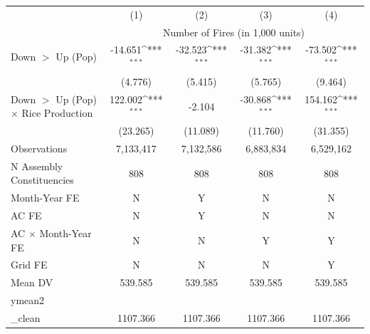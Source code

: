 {
\def\sym#1{\ifmmode^{#1}\else\(^{#1}\)\fi}
\begin{tabular}{l*{4}{c}}
\hline
            &\multicolumn{1}{c}{(1)}         &\multicolumn{1}{c}{(2)}         &\multicolumn{1}{c}{(3)}         &\multicolumn{1}{c}{(4)}         \\
            & \multicolumn{4}{c}{Number of Fires (in 1,000 units)} \\ \hline

Down $>$ Up (Pop)&     -14.651\sym{***}&     -32.523\sym{***}&     -31.382\sym{***}&     -73.502\sym{***}\\
            &     (4.776)         &     (5.415)         &     (5.765)         &     (9.464)         \\
Down $>$ Up (Pop) $\times$ Rice Production&     122.002\sym{***}&      -2.104         &     -30.868\sym{***}&     154.162\sym{***}\\
            &    (23.265)         &    (11.089)         &    (11.760)         &    (31.355)         \\
\hline
Observations&   7,133,417         &   7,132,586         &   6,883,834         &   6,529,162         \\
N Assembly Constituencies&         808         &         808         &         808         &         808         \\
Month-Year FE&           N         &           Y         &           N         &           N         \\
AC FE       &           N         &           Y         &           N         &           N         \\
AC $\times$ Month-Year FE&           N         &           N         &           Y         &           Y         \\
Grid FE     &           N         &           N         &           N         &           Y         \\
Mean DV     &     539.585         &     539.585         &     539.585         &     539.585         \\
ymean2\\_clean&    1107.366         &    1107.366         &    1107.366         &    1107.366         \\
\hline
\end{tabular}
}
